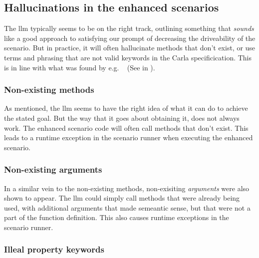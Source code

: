 \subsection{Hallucinations in the enhanced scenarios}

The \acrshort{llm} typically seems to be on the right track, outlining something
that \emph{sounds} like a good approach to satisfying our prompt of decreasing
the driveability of the scenario. But in practice, it will often hallucinate
methods that don't exist, or use terms and phrasing that are not valid keywords
in the Carla specificication. This is in line with what was found by e.g.
\citeauthor{autoSceneGen}~\cite[14542]{autoSceneGen} (See  in
).

\subsubsection{Non-existing methods}

As mentioned, the \acrshort{llm} seems to have the right idea of what it can do
to achieve the stated goal. But the way that it goes about obtaining it, does
not always work. The enhanced scenario code will often call methods that don't
exist. This leads to a runtime exception in the scenario runner when executing
the enhanced scenario. 

\subsubsection{Non-existing arguments}

In a similar vein to the non-existing methods, non-exisiting \emph{arguments}
were also shown to appear. The \acrshort{llm} could simply call methods that
were already being used, with additional arguments that made semeantic sense,
but that were not a part of the function definition. This also causes runtime
exceptions in the scenario runner.

\subsubsection{Illeal property keywords}

